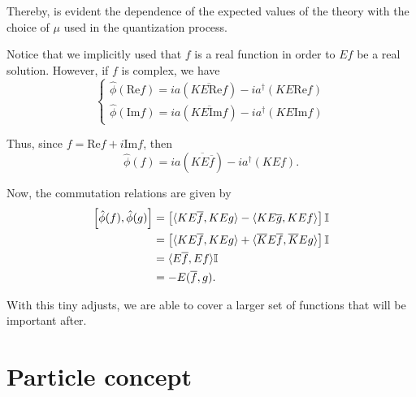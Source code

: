 Thereby, is evident the dependence of the expected values of the theory with the choice of \(\mu\) used in the quantization process.
\begin{remark}
    Notice that we implicitly used that \(f\) is a real function in order to \(Ef\) be a real solution. However, if \(f\) is complex, we have
    \begin{equation}
        \begin{cases}
            \hat{\phi}(\text{Re}f)=ia\left(\overline{KE\text{Re}f}\right)-ia^{\dagger}\left(KE\text{Re}f\right)\\
            \hat{\phi}(\text{Im}f)=ia\left(\overline{KE\text{Im}f}\right)-ia^{\dagger}\left(KE\text{Im}f\right)
        \end{cases}
    \end{equation}

    Thus, since \(f=\text{Re}f+i\text{Im}f\), then
    \begin{equation}
        \hat{\phi}(f)=ia\left(\overline{KE\overline{f}}\right)-ia^{\dagger}\left(KEf\right).
    \end{equation}

    Now, the commutation relations are given by
    \begin{subequations}
        \begin{align}
            \relax\left[\hat{\phi}(f),\hat{\phi}(g)\right]&=\left[\langle KE\overline{f},KEg\rangle-\langle KE\overline{g},KE f\rangle\right]\mathbb{I}\\
            &=\left[\langle KE\overline{f},KEg\rangle+\langle\overline{K}E\overline{f},\overline{K}Eg\rangle\right]\mathbb{I}\\
            &=\langle E\overline{f},Ef\rangle\mathbb{I}\\
            &=-E(\overline{f},g).
        \end{align}
    \end{subequations}

    With this tiny adjusts, we are able to cover a larger set of functions that will be important after.
\end{remark}
\vspace{1mm}
\begin{center}
\end{center}

\chapter{Particle concept}

